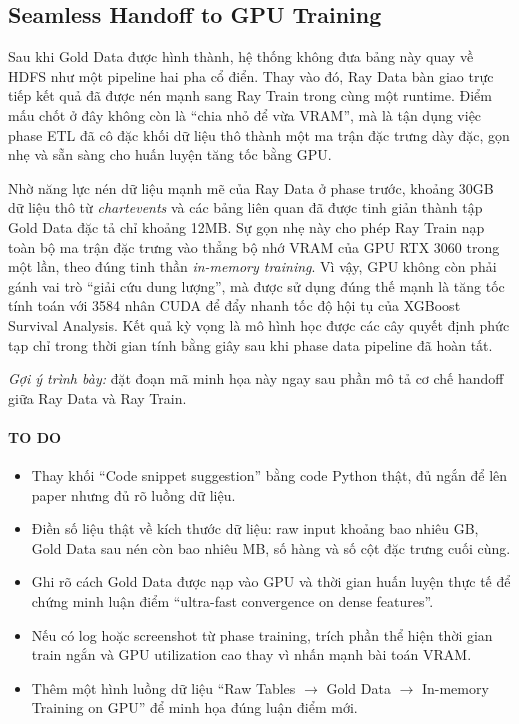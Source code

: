 \subsection{Seamless Handoff to GPU Training}
Sau khi Gold Data được hình thành, hệ thống không đưa bảng này quay về HDFS như một pipeline hai pha cổ điển. Thay vào đó, Ray Data bàn giao trực tiếp kết quả đã được nén mạnh sang Ray Train trong cùng một runtime. Điểm mấu chốt ở đây không còn là ``chia nhỏ để vừa VRAM'', mà là tận dụng việc phase ETL đã cô đặc khối dữ liệu thô thành một ma trận đặc trưng dày đặc, gọn nhẹ và sẵn sàng cho huấn luyện tăng tốc bằng GPU.

Nhờ năng lực nén dữ liệu mạnh mẽ của Ray Data ở phase trước, khoảng 30GB dữ liệu thô từ \textit{chartevents} và các bảng liên quan đã được tinh giản thành tập Gold Data đặc tả chỉ khoảng 12MB. Sự gọn nhẹ này cho phép Ray Train nạp toàn bộ ma trận đặc trưng vào thẳng bộ nhớ VRAM của GPU RTX 3060 trong một lần, theo đúng tinh thần \textit{in-memory training}. Vì vậy, GPU không còn phải gánh vai trò ``giải cứu dung lượng'', mà được sử dụng đúng thế mạnh là tăng tốc tính toán với 3584 nhân CUDA để đẩy nhanh tốc độ hội tụ của XGBoost Survival Analysis. Kết quả kỳ vọng là mô hình học được các cây quyết định phức tạp chỉ trong thời gian tính bằng giây sau khi phase data pipeline đã hoàn tất.

\noindent
{}

\textit{Gợi ý trình bày:} đặt đoạn mã minh họa này ngay sau phần mô tả cơ chế handoff giữa Ray Data và Ray Train.

\paragraph{TO DO}
\begin{itemize}
    \item Thay khối ``Code snippet suggestion'' bằng code Python thật, đủ ngắn để lên paper nhưng đủ rõ luồng dữ liệu.
    \item Điền số liệu thật về kích thước dữ liệu: raw input khoảng bao nhiêu GB, Gold Data sau nén còn bao nhiêu MB, số hàng và số cột đặc trưng cuối cùng.
    \item Ghi rõ cách Gold Data được nạp vào GPU và thời gian huấn luyện thực tế để chứng minh luận điểm ``ultra-fast convergence on dense features''.
    \item Nếu có log hoặc screenshot từ phase training, trích phần thể hiện thời gian train ngắn và GPU utilization cao thay vì nhấn mạnh bài toán VRAM.
    \item Thêm một hình luồng dữ liệu ``Raw Tables $\rightarrow$ Gold Data $\rightarrow$ In-memory Training on GPU'' để minh họa đúng luận điểm mới.
\end{itemize}